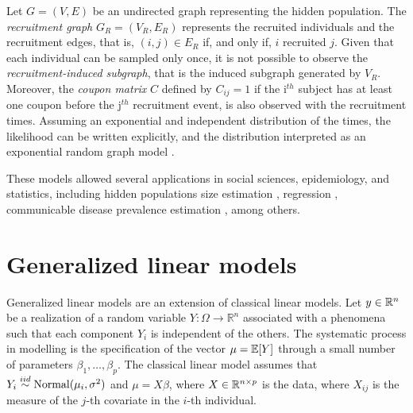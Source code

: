 Let $G = (V,E)$ be an undirected graph representing the hidden population. The {\em recruitment graph} $G_R =
(V_R, E_R)$ represents the recruited individuals and the recruitment edges,
that is, $(i,j) \in E_R$ if, and only if, $i$ recruited $j$.
Given that each individual can be sampled only once, it is not possible to
observe the {\em recruitment-induced subgraph}, that is the induced subgraph
generated by $V_R$. Moreover, the {\em coupon matrix} $C$ defined by $C_{ij} =
1$ if the i$^{th}$ subject has at least one coupon before the j$^{th}$
recruitment event, is also observed with the recruitment times. Assuming an
exponential and independent distribution of the times, the likelihood can be
written explicitly, and the distribution interpreted as an exponential random graph
model \cite[]{crawford2016}.  

These models allowed several applications in social sciences, epidemiology,
and statistics, including hidden populations size estimation
\cite[]{crawford2018hidden}, regression \cite[]{bastos2012binary}, communicable
disease prevalence estimation \cite[]{albuquerque2009avaliaccao}, among
others.


\section{Generalized linear models}
\label{sec:glm}

Generalized linear models are an extension of classical linear models. 
Let $y \in \mathbb{R}^{n}$ be a realization of a random variable 
$Y : \Omega \to \mathbb{R}^n$ associated with a phenomena such that each 
component $Y_i$ is independent of the others. The systematic process in 
modelling is the specification of the vector $\mu = \mathbb{E}[Y]$ through a small 
number of parameters $\beta_1, \dots, \beta_p$. The classical linear model 
assumes that $Y_i \overset{iid}{\sim} \operatorname{Normal}(\mu_i, \sigma^2)$ and $\mu = X\beta$,
where $X \in \mathbb{R}^{n \times p}$ is the data, where $X_{ij}$ is the measure 
of the $j$-th covariate in the $i$-th individual. 

